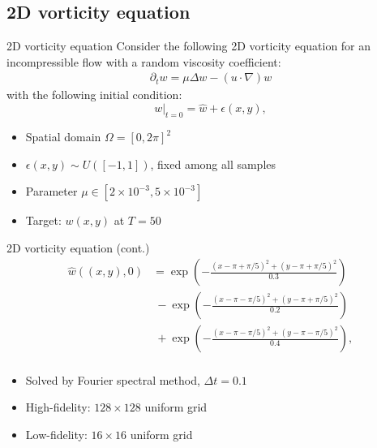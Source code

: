 \documentclass[10pt]{beamer}
\begin{document}
\subsection{2D vorticity equation}

\begin{frame}{2D vorticity equation}
Consider the following 2D vorticity equation for an incompressible flow \cite{2dNS} with a random viscosity coefficient:
\begin{equation}
\begin{split}
    \label{example10}
    \partial_t w = \mu\Delta w-(u\cdot\nabla)w
\end{split}
\end{equation}
with the following initial condition:
\begin{equation}
    w|_{t=0} = \hat{w}+\epsilon(x, y),
\end{equation}
\begin{itemize}
	\item Spatial domain $\Omega = [0, 2\pi]^2$
	\item $\epsilon(x, y)\sim U([-1, 1])$, fixed among all samples
	\item Parameter $\mu \in [2\times 10^{-3}, 5\times 10^{-3}]$
	\item Target: $w(x, y)$ at $T = 50$
\end{itemize}

\end{frame}

\begin{frame}{2D vorticity equation (cont.)}
\begin{equation}
\begin{split}
    \hat{w}((x, y),0)&= \exp\left(-\frac{(x-\pi+\pi/5)^2+(y-\pi+\pi/5)^2}{0.3}\right) \\
    &\ -\exp\left(-\frac{(x-\pi-\pi/5)^2+(y-\pi+\pi/5)^2}{0.2}\right) \\
    &\ +\exp\left(-\frac{(x-\pi-\pi/5)^2+(y-\pi-\pi/5)^2}{0.4}\right), \\
\end{split}
\end{equation}
\begin{itemize}
	\item Solved by Fourier spectral method, $\Delta t = 0.1$
	\item High-fidelity: $128\times 128$ uniform grid
	\item Low-fidelity: $16\times 16$ uniform grid
\end{itemize}
\end{frame}
\end{document}
